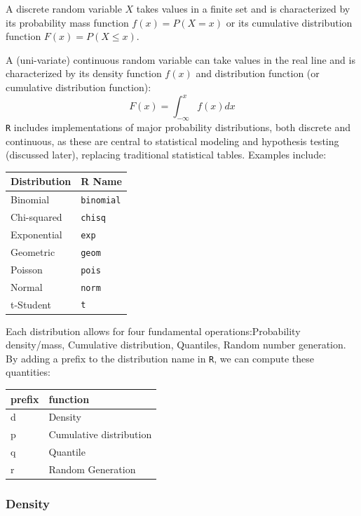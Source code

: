 \documentclass[
]{article}
\begin{document}
A discrete random variable \(X\) takes values in a finite set and is
characterized by its probability mass function \(f(x) = P(X = x)\) or
its cumulative distribution function \(F(x) = P(X \leq x)\).

A (uni-variate) continuous random variable can take values in the real
line and is characterized by its density function \(f(x)\) and
distribution function (or cumulative distribution function):
\[F(x) = \int_{-\infty}^x f(x) dx\] \texttt{R} includes implementations
of major probability distributions, both discrete and continuous, as
these are central to statistical modeling and hypothesis testing
(discussed later), replacing traditional statistical tables. Examples
include:

\begin{longtable}[]{@{}ll@{}}
\toprule\noalign{}
\textbf{Distribution} & \textbf{R Name} \\
\midrule\noalign{}
\endhead
\bottomrule\noalign{}
\endlastfoot
Binomial & \texttt{binomial} \\
Chi-squared & \texttt{chisq} \\
Exponential & \texttt{exp} \\
Geometric & \texttt{geom} \\
Poisson & \texttt{pois} \\
Normal & \texttt{norm} \\
t-Student & \texttt{t} \\
\end{longtable}

Each distribution allows for four fundamental operations:Probability
density/mass, Cumulative distribution, Quantiles, Random number
generation. By adding a prefix to the distribution name in \texttt{R},
we can compute these quantities:

\begin{longtable}[]{@{}ll@{}}
\toprule\noalign{}
\textbf{prefix} & \textbf{function} \\
\midrule\noalign{}
\endhead
\bottomrule\noalign{}
\endlastfoot
d & Density \\
p & Cumulative distribution \\
q & Quantile \\
r & Random Generation \\
\end{longtable}

\hypertarget{density}{%
\subsubsection{Density}\label{density}}
\end{document}
